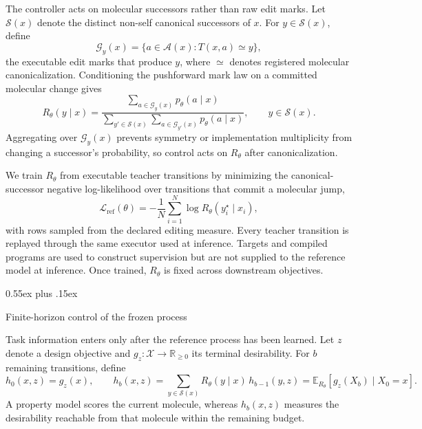 \documentclass{article}
\makeatletter
\theoremstyle{definition}
\theoremstyle{remark}
\def\subsection{\@startsection{subsection}{2}{\z@}{-1.2ex plus -0.4ex minus -.2ex}%
  {0.55ex plus .15ex}{\normalsize\sc\raggedright}}
\makeatother
\begin{document}
The controller acts on molecular successors rather than raw edit marks. Let
$\mathcal S(x)$ denote the distinct non-self canonical successors of $x$. For
$y\in\mathcal S(x)$, define
\[
  \mathcal G_y(x)
  =
  \{a\in\mathcal A(x): T(x,a)\simeq y\},
\]
the executable edit marks that produce $y$, where $\simeq$ denotes registered
molecular canonicalization. Conditioning the pushforward mark law on a committed
molecular change gives
\begin{equation}
  R_\theta(y\mid x)
  =
  \frac{
    \sum_{a\in\mathcal G_y(x)} p_\theta(a\mid x)
  }{
    \sum_{y'\in\mathcal S(x)}
    \sum_{a\in\mathcal G_{y'}(x)} p_\theta(a\mid x)
  },
  \qquad y\in\mathcal S(x).
  \label{eq:gem-rtheta}
\end{equation}
Aggregating over $\mathcal G_y(x)$ prevents symmetry or implementation
multiplicity from changing a successor's probability, so control acts on
$R_\theta$ after canonicalization.

We train $R_\theta$ from executable teacher transitions by minimizing the
canonical-successor negative log-likelihood over transitions that commit a
molecular jump,
\begin{equation}
  \mathcal L_{\mathrm{ref}}(\theta)
  =
  -\frac{1}{N}\sum_{i=1}^{N}\log R_\theta(y_i^\star\mid x_i),
  \label{eq:gem-refloss}
\end{equation}
with rows sampled from the declared editing measure.
Every teacher transition is replayed through the same executor used at
inference. Targets and compiled programs are used to construct supervision but
are not supplied to the reference model at inference. Once trained, $R_\theta$ is
fixed across downstream objectives.

\subsection{Finite-horizon control of the frozen process}
\label{sec:gem-control}

Task information enters only after the reference process has been learned. Let $z$ denote a design objective and $g_z:\mathcal X\rightarrow\mathbb R_{\geq0}$
its terminal desirability. For $b$ remaining transitions, define
\begin{equation}
  h_0(x,z)=g_z(x),
  \qquad
  h_b(x,z)
  =
  \sum_{y\in\mathcal S(x)} R_\theta(y\mid x)\, h_{b-1}(y,z)
  =
  \mathbb E_{R_\theta}\!\left[ g_z(X_b)\mid X_0=x \right].
  \label{eq:gem-backward}
\end{equation}
A property model scores the current molecule, whereas $h_b(x,z)$ measures the
desirability reachable from that molecule within the remaining budget.
\end{document}

